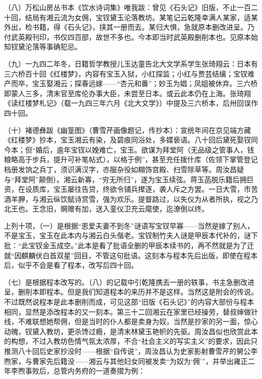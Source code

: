 \par （八）万松山房丛书本《饮水诗词集》唯我跋：曾见《石头记》旧版，不止一百二十回，结局有湘云流为女佣，宝钗黛玉沦落教坊。某笔记云乾隆幸满人某家，适某外出，检书籍，得《石头记》，挟其一册而去。某归大惧，急就原本删改进呈。乃付武英殿刊印，书仅四百部，故世不多也。今本即当时武英殿删削本也。见原本始知钗黛沦落等事确犯忌。
\par （九）一九四二年冬，日籍哲学教授儿玉达童告北大文学系学生张琦翔云：日本有三六桥百十回《红楼梦》，内容有宝玉入狱，小红探监；小红与贾芸结缡；宝钗难产而卒，宝玉娶湘云；探春远嫁——“杏元和番”；妙玉为娼；凤姐被休弃。三六桥即蒙人三多，清末官至库伦办事大臣，未尝至日本。或云此本仍在上海。张琦翔《读红楼梦札记》（载一九四三年六月《北大文学》）中提及三六桥本，后卅回误作四十回。
\par （十）褚德彝跋《幽篁图》（曹雪芹画像题记，传抄本）：宣统年间在京见端方藏《红楼梦》抄本，宝玉湘云有染，及碧痕同浴处，多媟亵语。八十回后黛死娶钗同今本；但“婚后，逾年宝钗以娩难亡，宝玉。欲谋为拜堂阿（无品级之管事人，钱粮略高于步兵，提升可补笔帖式），以格于例”，甚至充任拨什库（佐领下掌管登记档册发饷之兵丁，须识满汉字，亦服杂役如糊饰宫殿、扫雪除草等。周汝昌疑与“拜堂阿”颠倒）。湘云新寡，“穷无所归”，遂为宝玉续弦。蒋玉菡脱乐籍后拥巨资，在设质库，宝玉屡往告贷，终欲令铺兵撵逐，袭人斥之方罢。一日大雪，市苦酒羊胛，与湘云纵饮赋诗赏雪，强为欢乐。提督路过，以失仪为从者所执，视之乃北王也。王念旧，赒赠有加，送入銮仪卫充云麾使，迄潦倒以终。
\par 上列十项，（一）是根据“恩爱夫妻不到冬”谜语写宝钗早寡——当然是嫁了别人，不是宝玉，宝玉在此本内与湘云白头偕老。宝钗制竹夫人谜是甲辰本代补的，谜下批：“此宝钗金玉成空。”此本是看了批语全删的甲辰本续书的，再不然就是为了迁就“因麒麟伏白首双星”回目，不管这句批语。这刻本与程本先后出版，即使在程本后，似乎不会是看了程本，改写后四十回。
\par （七）是根据程本改写的。（八）的记载中引乾隆携去一册的轶事，书主急删改进呈，删削本即程本。但是我们知道程本的来历并不是这样。当然这是附会的传说。不过既然说程本是此本删削而成，可见这部“旧版《石头记》”的内容大部份与程本相同，显然是添改程本的又一刻本。第三十二回湘云在家里已经操劳，替叔婶做针线，不难联想她帮佣，但是当时的仆人都是卖身为奴，当然是抄家的另一面，惊心动魄，钗黛入教坊，更杀馋过瘾，是清末林黛玉艳帜的先驱。周汝昌似也欣赏此本的构想，不过入教坊色情气氛太浓厚，不合“社会主义的写实主义”的要求，因此只推测八十回后史家抄没时——根据“自传说”，周汝昌认为史家影射曹雪芹的舅公李煦家，与曹家先后籍没——湘云与其他妇女同被发卖“为奴为‘佣’”，并举出雍正二年李煦事败后，总管内务府的一道奏摺为例：

